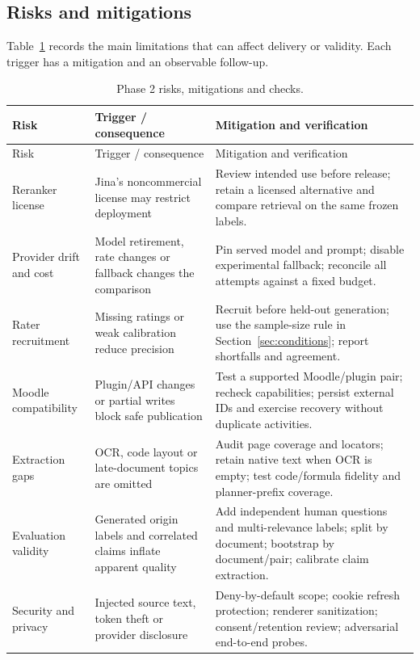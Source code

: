 \subsection{Risks and mitigations}
Table~\ref{tab:risks} records the main limitations that can affect delivery or validity. Each trigger has a mitigation and an observable follow-up.
\begin{longtable}{|p{3.0cm}|p{5.0cm}|p{5.9cm}|}\caption{Phase 2 risks, mitigations and checks.}\label{tab:risks}\\\hline
Risk & Trigger / consequence & Mitigation and verification\\\hline\endfirsthead
\hline Risk & Trigger / consequence & Mitigation and verification\\\hline\endhead
Reranker license & Jina's noncommercial license may restrict deployment & Review intended use before release; retain a licensed alternative and compare retrieval on the same frozen labels.\\\hline
Provider drift and cost & Model retirement, rate changes or fallback changes the comparison & Pin served model and prompt; disable experimental fallback; reconcile all attempts against a fixed budget.\\\hline
Rater recruitment & Missing ratings or weak calibration reduce precision & Recruit before held-out generation; use the sample-size rule in Section~\ref{sec:conditions}; report shortfalls and agreement.\\\hline
Moodle compatibility & Plugin/API changes or partial writes block safe publication & Test a supported Moodle/plugin pair; recheck capabilities; persist external IDs and exercise recovery without duplicate activities.\\\hline
Extraction gaps & OCR, code layout or late-document topics are omitted & Audit page coverage and locators; retain native text when OCR is empty; test code/formula fidelity and planner-prefix coverage.\\\hline
Evaluation validity & Generated origin labels and correlated claims inflate apparent quality & Add independent human questions and multi-relevance labels; split by document; bootstrap by document/pair; calibrate claim extraction.\\\hline
Security and privacy & Injected source text, token theft or provider disclosure & Deny-by-default scope; cookie refresh protection; renderer sanitization; consent/retention review; adversarial end-to-end probes.\\\hline
\end{longtable}
